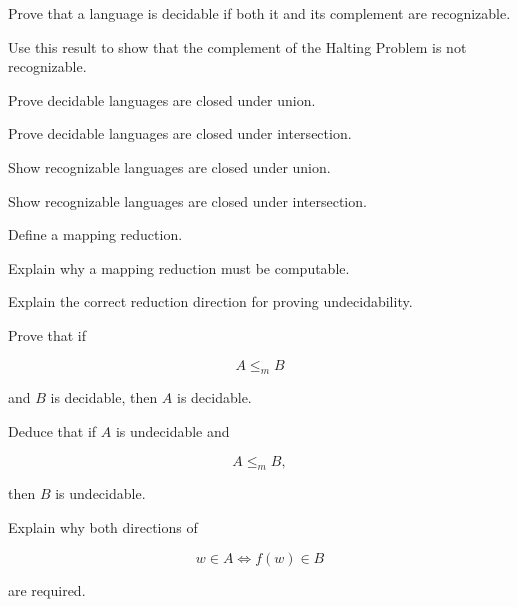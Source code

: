 \begin{exercise}[3]
Prove that a language is decidable if both it and its complement are
recognizable.
\end{exercise}

\begin{exercise}[3]
Use this result to show that the complement of the Halting Problem is not
recognizable.
\end{exercise}

\begin{exercise}[3]
Prove decidable languages are closed under union.
\end{exercise}

\begin{exercise}[3]
Prove decidable languages are closed under intersection.
\end{exercise}

\begin{exercise}[3]
Show recognizable languages are closed under union.
\end{exercise}

\begin{exercise}[3]
Show recognizable languages are closed under intersection.
\end{exercise}

\begin{exercise}[2]
Define a mapping reduction.
\end{exercise}

\begin{exercise}[3]
Explain why a mapping reduction must be computable.
\end{exercise}

\begin{exercise}[3]
Explain the correct reduction direction for proving undecidability.
\end{exercise}

\begin{exercise}[3]
Prove that if

\[
A\leq_mB
\]

and \(B\) is decidable, then \(A\) is decidable.
\end{exercise}

\begin{exercise}[3]
Deduce that if \(A\) is undecidable and

\[
A\leq_mB,
\]

then \(B\) is undecidable.
\end{exercise}

\begin{exercise}[3]
Explain why both directions of

\[
w\in A
\iff
f(w)\in B
\]

are required.
\end{exercise}

